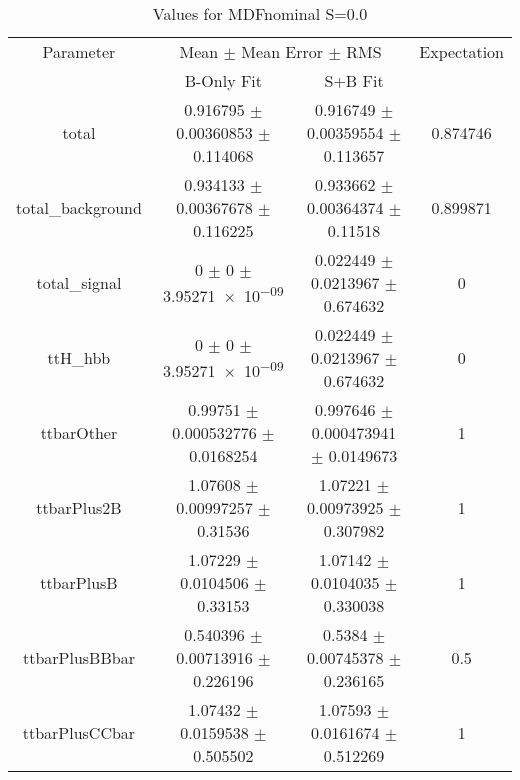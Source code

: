 \begin{table}
\centering
\caption{Values for MDFnominal S=0.0}
\begin{tabular}{cccc}
\toprule
Parameter & \multicolumn{2}{c}{Mean $\pm$ Mean Error $\pm$ RMS} & Expectation\\
 & B-Only Fit & S+B Fit & \\
\midrule
total & \num{0.916795} $\pm$ \num{0.00360853} $\pm$ \num{0.114068} & \num{0.916749} $\pm$ \num{0.00359554} $\pm$ \num{0.113657} & \num{0.874746}\\
total\_background & \num{0.934133} $\pm$ \num{0.00367678} $\pm$ \num{0.116225} & \num{0.933662} $\pm$ \num{0.00364374} $\pm$ \num{0.11518} & \num{0.899871}\\
total\_signal & \num{0} $\pm$ \num{0} $\pm$ \num{3.95271e-09} & \num{0.022449} $\pm$ \num{0.0213967} $\pm$ \num{0.674632} & \num{0}\\
ttH\_hbb & \num{0} $\pm$ \num{0} $\pm$ \num{3.95271e-09} & \num{0.022449} $\pm$ \num{0.0213967} $\pm$ \num{0.674632} & \num{0}\\
ttbarOther & \num{0.99751} $\pm$ \num{0.000532776} $\pm$ \num{0.0168254} & \num{0.997646} $\pm$ \num{0.000473941} $\pm$ \num{0.0149673} & \num{1}\\
ttbarPlus2B & \num{1.07608} $\pm$ \num{0.00997257} $\pm$ \num{0.31536} & \num{1.07221} $\pm$ \num{0.00973925} $\pm$ \num{0.307982} & \num{1}\\
ttbarPlusB & \num{1.07229} $\pm$ \num{0.0104506} $\pm$ \num{0.33153} & \num{1.07142} $\pm$ \num{0.0104035} $\pm$ \num{0.330038} & \num{1}\\
ttbarPlusBBbar & \num{0.540396} $\pm$ \num{0.00713916} $\pm$ \num{0.226196} & \num{0.5384} $\pm$ \num{0.00745378} $\pm$ \num{0.236165} & \num{0.5}\\
ttbarPlusCCbar & \num{1.07432} $\pm$ \num{0.0159538} $\pm$ \num{0.505502} & \num{1.07593} $\pm$ \num{0.0161674} $\pm$ \num{0.512269} & \num{1}\\
\bottomrule
\end{tabular}
\end{table}
